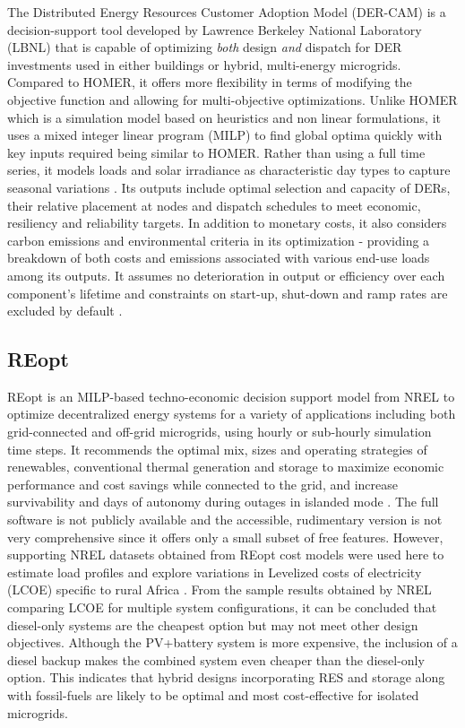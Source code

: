 \documentclass[final,3p,times]{elsarticle}
\begin{document}
The Distributed Energy Resources Customer Adoption Model (DER-CAM) is a decision-support tool developed by Lawrence Berkeley National Laboratory (LBNL) that is capable of optimizing \textit{both} design \textit{and} dispatch for DER investments used in either buildings or hybrid, multi-energy microgrids. Compared to HOMER, it offers more flexibility in terms of modifying the objective function and allowing for multi-objective optimizations. Unlike HOMER which is a simulation model based on heuristics and non linear formulations, it uses a mixed integer linear program (MILP) to find global optima quickly \cite{dercam} with key inputs required being similar to HOMER. Rather than using a full time series, it models loads and solar irradiance as characteristic day types to capture seasonal variations \cite{weng2016}. Its outputs include optimal selection and capacity of DERs, their relative placement at nodes and dispatch schedules to meet economic, resiliency and reliability targets. In addition to monetary costs, it also considers carbon emissions and environmental criteria in its optimization - providing a breakdown of both costs and emissions associated with various end-use loads among its outputs. It assumes no deterioration in output or efficiency over each component's lifetime and constraints on start-up, shut-down and ramp rates are excluded by default \cite{dercam}.

\subsection{REopt}

REopt is an MILP-based techno-economic decision support model from NREL to optimize decentralized energy systems for a variety of applications including both grid-connected and off-grid microgrids, using hourly or sub-hourly simulation time steps. It recommends the optimal mix, sizes and operating strategies of renewables, conventional thermal generation and storage to maximize economic performance and cost savings while connected to the grid, and increase survivability and days of autonomy during outages in islanded mode \cite{tools_summary}. The full software is not publicly available and the accessible, rudimentary version is not very comprehensive since it offers only a small subset of free features. However, supporting NREL datasets obtained from REopt cost models were used here to estimate load profiles and explore variations in Levelized costs of electricity (LCOE) specific to rural Africa \cite{nrel_data}. From the sample results obtained by NREL comparing LCOE for multiple system configurations, it can be concluded that diesel-only systems are the cheapest option but may not meet other design objectives. Although the PV+battery system is more expensive, the inclusion of a diesel backup makes the combined system even cheaper than the diesel-only option. This indicates that hybrid designs incorporating RES and storage along with fossil-fuels are likely to be optimal and most cost-effective for isolated microgrids.
\end{document}

